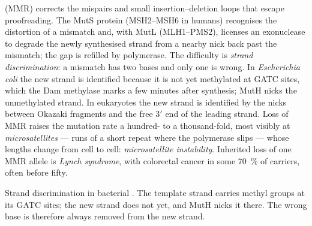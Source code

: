 \begin{definition}\label{def:b3:dna-repair:mmr}
\emph{} (MMR) corrects the mispairs and small
insertion--deletion loops that escape proofreading. The MutS protein
(MSH2--MSH6 in humans) recognises the distortion of a mismatch and,
with MutL (MLH1--PMS2), licenses an exonuclease to degrade the newly
synthesised strand from a nearby nick back past the mismatch; the
gap is refilled by polymerase. The difficulty is \emph{strand
discrimination}: a mismatch has two bases and only one is wrong. In
\emph{Escherichia coli} the new strand is identified because it is not
yet methylated at GATC sites, which the Dam methylase marks a few
minutes after synthesis; MutH nicks the unmethylated strand. In
eukaryotes the new strand is identified by the nicks between Okazaki
fragments and the free 3$'$ end of the leading strand. Loss of MMR
raises the mutation rate a hundred- to a thousand-fold, most visibly
at \emph{microsatellites} --- runs of a short repeat where the
polymerase slips --- whose lengths change from cell to cell:
\emph{microsatellite instability}. Inherited loss of one MMR allele is
\emph{Lynch syndrome}, with colorectal cancer in some \qty{70}{\%} of
carriers, often before fifty.
\end{definition}

\begin{omfigure}

{\small Strand discrimination in bacterial . The
template strand carries methyl groups at its GATC sites; the new
strand does not yet, and MutH nicks it there. The wrong base is
therefore always removed from the new strand.}
\end{omfigure}

